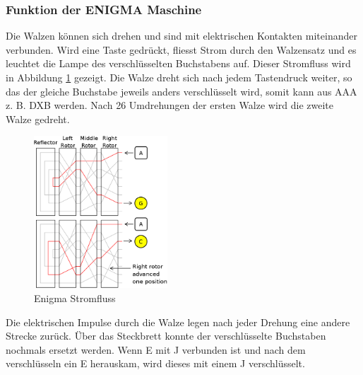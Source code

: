 \subsubsection{Funktion der ENIGMA Maschine}
Die Walzen können sich drehen und sind mit elektrischen Kontakten miteinander verbunden. Wird eine Taste gedrückt, fliesst Strom durch den Walzensatz und es leuchtet die Lampe des verschlüsselten Buchstabens auf. Dieser Stromfluss wird in Abbildung \ref{fig:stromfluss} gezeigt. Die Walze dreht sich nach jedem Tastendruck weiter, so das der gleiche Buchstabe jeweils anders verschlüsselt wird, somit kann aus AAA z. B. DXB werden. Nach 26 Umdrehungen der ersten Walze wird die zweite Walze gedreht. \\
%
\begin{figure}[ht]
\begin{center}
\includegraphics[width=5cm]{images/Enigma-action.png}
\caption{Enigma Stromfluss}
\label{fig:stromfluss}
\end{center}
\end{figure}
%
Die elektrischen Impulse durch die Walze legen nach jeder Drehung eine andere Strecke zurück. 
Über das Steckbrett konnte der verschlüsselte Buchstaben nochmals ersetzt werden. Wenn E mit J verbunden ist und nach dem verschlüsseln ein E herauskam, wird dieses mit einem J verschlüsselt. 
%
